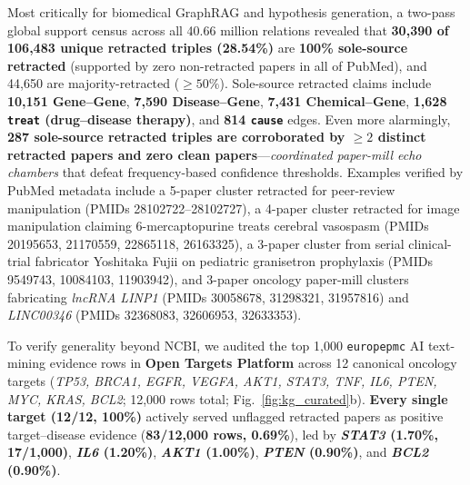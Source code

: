 \documentclass[11pt,letterpaper]{article}
\begin{document}
Most critically for biomedical GraphRAG and hypothesis generation, a two-pass global support census across all 40.66 million relations revealed that \textbf{30,390 of 106,483 unique retracted triples (28.54\%)} are \textbf{100\% sole-source retracted} (supported by zero non-retracted papers in all of PubMed), and 44,650 are majority-retracted ($\ge 50\%$). Sole-source retracted claims include \textbf{10,151 Gene--Gene}, \textbf{7,590 Disease--Gene}, \textbf{7,431 Chemical--Gene}, \textbf{1,628 \texttt{treat} (drug--disease therapy)}, and \textbf{814 \texttt{cause}} edges. Even more alarmingly, \textbf{287 sole-source retracted triples are corroborated by $\ge 2$ distinct retracted papers and zero clean papers}—\emph{coordinated paper-mill echo chambers} that defeat frequency-based confidence thresholds. Examples verified by PubMed metadata include a 5-paper cluster retracted for peer-review manipulation (PMIDs 28102722--28102727), a 4-paper cluster retracted for image manipulation claiming 6-mercaptopurine treats cerebral vasospasm (PMIDs 20195653, 21170559, 22865118, 26163325), a 3-paper cluster from serial clinical-trial fabricator Yoshitaka Fujii on pediatric granisetron prophylaxis (PMIDs 9549743, 10084103, 11903942), and 3-paper oncology paper-mill clusters fabricating \emph{lncRNA LINP1} (PMIDs 30058678, 31298321, 31957816) and \emph{LINC00346} (PMIDs 32368083, 32606953, 32633353).

To verify generality beyond NCBI, we audited the top 1,000 \texttt{europepmc} AI text-mining evidence rows in \textbf{Open Targets Platform} \citep{ochoa2023_opentargets_main} across 12 canonical oncology targets (\emph{TP53, BRCA1, EGFR, VEGFA, AKT1, STAT3, TNF, IL6, PTEN, MYC, KRAS, BCL2}; 12,000 rows total; Fig.~\ref{fig:kg_curated}b). \textbf{Every single target (12/12, 100\%)} actively served unflagged retracted papers as positive target--disease evidence (\textbf{83/12,000 rows, 0.69\%}), led by \textbf{\emph{STAT3} (1.70\%, 17/1,000)}, \textbf{\emph{IL6} (1.20\%)}, \textbf{\emph{AKT1} (1.00\%)}, \textbf{\emph{PTEN} (0.90\%)}, and \textbf{\emph{BCL2} (0.90\%)}.
\end{document}
